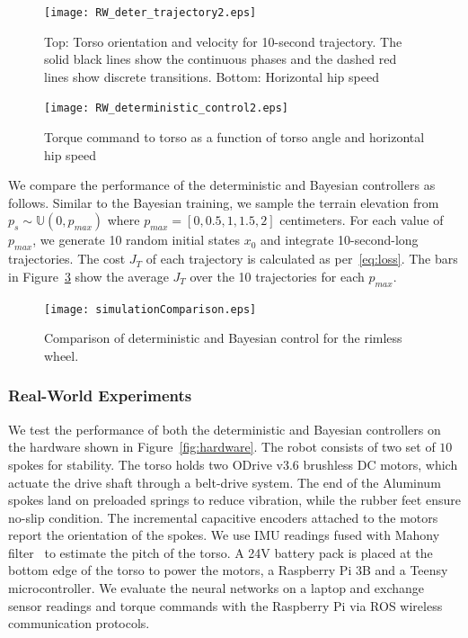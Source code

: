 \begin{figure}[H]
    \centering
    \texttt{[image: RW\_deter\_trajectory2.eps]}
    \caption{Top: Torso orientation and velocity for 10-second trajectory. The
            solid black lines show the continuous phases and the dashed red
            lines show discrete transitions. Bottom: Horizontal hip speed}
    \label{fig:deter_rw_trajectory}
\end{figure}

\begin{figure}[H]
    \centering
    \texttt{[image: RW\_deterministic\_control2.eps]}
    \caption{Torque command to torso as a function of torso angle and horizontal hip speed}
    \label{fig:deter_control}
\end{figure}
We compare the performance of the deterministic and Bayesian controllers as
follows.
%
Similar to the Bayesian training, we sample the terrain elevation from $p_s \sim
\mathbb{U}(0, p_{max})$ where $p_{max} = [0, 0.5, 1, 1.5, 2]$ centimeters.
%
For each value of $p_{max}$, we generate 10 random initial states $x_0$ and
integrate 10-second-long trajectories.
%
The cost $J_T$ of each trajectory is calculated as per~\eqref{eq:loss}.
%
The bars in Figure~\ref{fig:comparison} show the average $J_T$ over the
10 trajectories for each $p_{max}$.

\begin{figure}[H]
    \centering
    \texttt{[image: simulationComparison.eps]}
    \caption{Comparison of deterministic and Bayesian control for the rimless wheel.}
    \label{fig:comparison}
\end{figure}

\subsubsection{Real-World Experiments}

We test the performance of both the deterministic and Bayesian controllers on
the hardware shown in Figure~\ref{fig:hardware}.
%
The robot consists of two set of $10$ spokes for stability.
%
The torso holds two ODrive v3.6 brushless DC motors, which actuate the drive
shaft through a belt-drive system.
%
The end of the Aluminum spokes land on preloaded springs to reduce vibration,
while the rubber feet ensure no-slip condition.
%
The incremental capacitive encoders attached to the motors report the
orientation of the spokes.
%
We use IMU readings fused with Mahony filter~\cite{mahony2008nonlinear} to estimate
the pitch of the torso.
%
A 24V battery pack is placed at the bottom edge of the torso to power
the motors, a Raspberry Pi 3B and a Teensy microcontroller.
%
We evaluate the neural networks on a laptop and exchange sensor readings and
torque commands with the Raspberry Pi via ROS wireless communication protocols.


